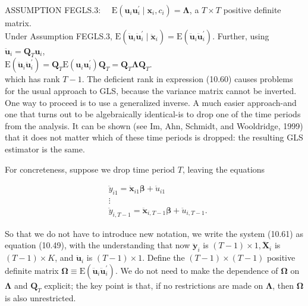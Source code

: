 \documentclass[10pt]{article}
\begin{document}
ASSUMPTION FEGLS.3: $\quad \mathrm{E}\left(\mathbf{u}_{i} \mathbf{u}_{i}^{\prime} \mid \mathbf{x}_{i}, c_{i}\right)=\boldsymbol{\Lambda}$, a $T \times T$ positive definite matrix.\\
Under Assumption FEGLS.3, $\mathrm{E}\left(\ddot{\mathbf{u}}_{i} \ddot{\mathbf{u}}_{i}^{\prime} \mid \ddot{\mathbf{x}}_{i}\right)=\mathrm{E}\left(\ddot{\mathbf{u}}_{i} \ddot{\mathbf{u}}_{i}^{\prime}\right)$. Further, using $\ddot{\mathbf{u}}_{i}=\mathbf{Q}_{T} \mathbf{u}_{i}$,\\
$\mathrm{E}\left(\ddot{\mathbf{u}}_{i} \ddot{\mathbf{u}}_{i}^{\prime}\right)=\mathbf{Q}_{T} \mathrm{E}\left(\mathbf{u}_{i} \mathbf{u}_{i}^{\prime}\right) \mathbf{Q}_{T}=\mathbf{Q}_{T} \boldsymbol{\Lambda} \mathbf{Q}_{T}$.\\
which has rank $T-1$. The deficient rank in expression (10.60) causes problems for the usual approach to GLS, because the variance matrix cannot be inverted. One way to proceed is to use a generalized inverse. A much easier approach-and one that turns out to be algebraically identical-is to drop one of the time periods from the analysis. It can be shown (see Im, Ahn, Schmidt, and Wooldridge, 1999) that it does not matter which of these time periods is dropped: the resulting GLS estimator is the same.

For concreteness, suppose we drop time period $T$, leaving the equations


\begin{align*}
& \ddot{y}_{i 1}=\ddot{\mathbf{x}}_{i 1} \boldsymbol{\beta}+\ddot{u}_{i 1} \\
& \vdots  \tag{10.61}\\
& \ddot{y}_{i, T-1}=\ddot{\mathbf{x}}_{i, T-1} \boldsymbol{\beta}+\ddot{u}_{i, T-1} .
\end{align*}


So that we do not have to introduce new notation, we write the system (10.61) as equation (10.49), with the understanding that now $\ddot{\mathbf{y}}_{i}$ is $(T-1) \times 1, \ddot{\mathbf{X}}_{i}$ is $(T-1) \times K$, and $\ddot{\mathbf{u}}_{i}$ is $(T-1) \times 1$. Define the $(T-1) \times(T-1)$ positive definite matrix $\boldsymbol{\Omega} \equiv \mathrm{E}\left(\ddot{\mathbf{u}}_{i} \ddot{\mathbf{u}}_{i}^{\prime}\right)$. We do not need to make the dependence of $\boldsymbol{\Omega}$ on $\boldsymbol{\Lambda}$ and $\mathbf{Q}_{T}$ explicit; the key point is that, if no restrictions are made on $\boldsymbol{\Lambda}$, then $\boldsymbol{\Omega}$ is also unrestricted.
\end{document}
